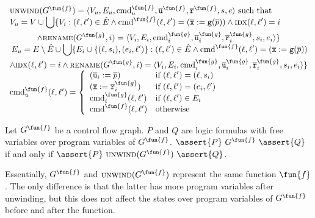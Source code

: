 \[
\begin{array}{l}
\textsc{unwind}(G^\fun{f}) = \langle V_u, E_u,\textmd{cmd}_u^\fun{f}, \overline{\texttt{u}}^\fun{f}, \overline{\texttt{r}}^\fun{f},s,e \rangle \text{ such that} \\

\begin{split}
 V_u = V\cup\bigcup\{V_i:(\ell,\ell')\in\hat{E} \wedge \textmd{cmd}^\fun{f}(\ell,\ell')=(\overline{\texttt{x}}:=\mathtt{g}(\overline{p}))\wedge\textsc{idx}(\ell, \ell')=i  \\
  \wedge \textsc{rename}(G^\fun{g},i)=\langle V_i, E_i,\textmd{cmd}^\fun{g}_i, \overline{\texttt{u}}^\fun{g}_i, \overline{\texttt{r}}^\fun{g}_i,s_i,e_i\rangle \}
\end{split}\\

\begin{split}
 E_u = E \setminus \hat{E} \cup \bigcup\{E_i\cup\{(\ell, s_i),(e_i, \ell')\}: (\ell, \ell')\in \hat{E} \wedge \textmd{cmd}^\fun{f}(\ell, \ell')=(\overline{\texttt{x}}:=\mathtt{g}(\overline{p})) \\
  \wedge \textsc{idx}(\ell, \ell')=i \wedge \textsc{rename}(G^\fun{g},i) =
\langle V_i, E_i,\textmd{cmd}^\fun{g}_i, \overline{\texttt{u}}^\fun{g}_i, \overline{\texttt{r}}^\fun{g}_i,s_i,e_i\rangle \}
\end{split}\\

\textmd{cmd}_u^\fun{f} (\ell, \ell') =
\left\{
  \begin{array}{ll}
  (\overline{\texttt{u}}_i:=\overline{p}) &\text{if } (\ell,\ell')=(\ell,s_i)
  \\
  (\overline{\texttt{x}}:=\overline{\texttt{r}}^\fun{g}_i) &\text{if } (\ell,\ell')=(e_i,\ell') \\
  \textmd{cmd}^\fun{g}_i(\ell, \ell') &\text{if } (\ell, \ell') \in E_i \\
  \textmd{cmd}^\fun{f}(\ell,\ell') &\text{otherwise}
  \end{array}
\right.

\end{array}
\]

\begin{proposition}
  Let $G^\fun{f}$ be a control flow graph. $P$ and $Q$ are logic formulas with
  free variables over program variables of $G^\fun{f}$. $\assert{P}\ G^\fun{f}\
  \assert{Q}$ if and only if $\assert{P}\ \textsc{unwind} (G^\fun{f})\ \assert{Q}$.
\end{proposition}
Essentially, $G^\fun{f}$ and $\textsc{unwind} (G^\fun{f})$ represent the same function $\fun{f}$. The only difference is that the latter has more program variables after unwinding, but this does not affect the states over program variables of $G^\fun{f}$ before and after the function.


